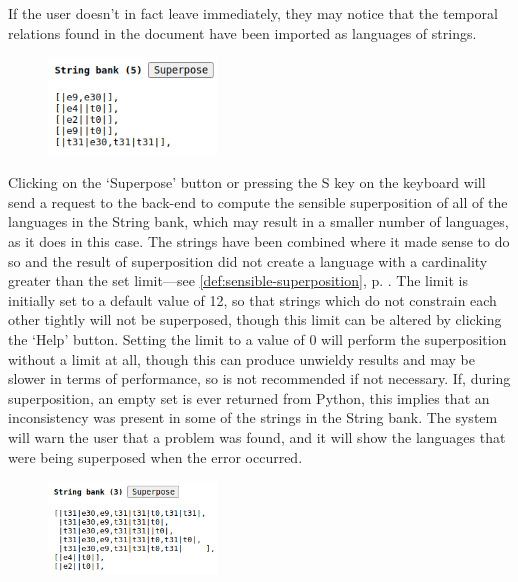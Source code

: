 \documentclass[a4paper,12pt,leqno]{article}
\begin{document}
If the user doesn't in fact leave immediately, they may notice that the temporal relations found in the document have been imported as languages of strings.
\begin{center}
	\begin{figure}[h!]
		\centering
		\includegraphics[width=0.4\textwidth]{images/START-sp-1.png}
	\end{figure}
\end{center}
Clicking on the `Superpose' button or pressing the S key on the keyboard will send a request to the back-end to compute the sensible superposition of all of the languages in the String bank, which may result in a smaller number of languages, as it does in this case. The strings have been combined where it made sense to do so and the result of superposition did not create a language with a cardinality greater than the set limit---see \cref{def:sensible-superposition}, p. \pageref{def:sensible-superposition}. The limit is initially set to a default value of 12, so that strings which do not constrain each other tightly will not be superposed, though this limit can be altered by clicking the `Help' button. Setting the limit to a value of 0 will perform the superposition without a limit at all, though this can produce unwieldy results and may be slower in terms of performance, so is not recommended if not necessary. If, during superposition, an empty set is ever returned from Python, this implies that an inconsistency was present in some of the strings in the String bank. The system will warn the user that a problem was found, and it will show the languages that were being superposed when the error occurred.
\begin{center}
	\begin{figure}[h!]
		\centering
		\includegraphics[width=0.4\textwidth]{images/START-sp-2.png}
	\end{figure}
\end{center}
\end{document}
